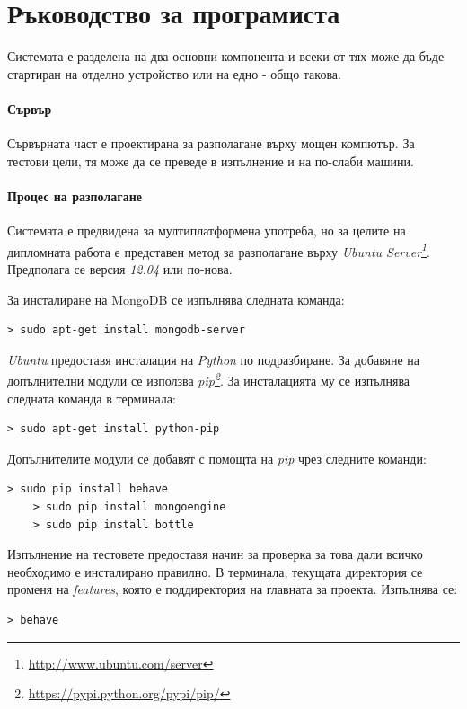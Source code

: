 \chapter{Ръководство за програмиста}
	
	Системата е разделена на два основни компонента и всеки от тях може да бъде стартиран на отделно устройство или на едно - общо такова.
	
	\subsubsection{Сървър}
	
	Сървърната част е проектирана за разполагане върху мощен компютър. За тестови цели, тя може да се преведе в изпълнение и на по-слаби машини.
	
	\subsubsection{Процес на разполагане}
	
	Системата е предвидена за мултиплатформена употреба, но за целите на дипломната работа е представен метод за разполагане върху \emph{Ubuntu Server\footnote{\url{http://www.ubuntu.com/server}}}. Предполага се версия \emph{12.04} или по-нова.
	
	За инсталиране на MongoDB се изпълнява следната команда:
	\begin{lstlisting}[style=BashStyle]
    > sudo apt-get install mongodb-server
	\end{lstlisting}
	
	\emph{Ubuntu} предоставя инсталация на \emph{Python} по подразбиране. За добавяне на допълнителни модули се използва \emph{pip\footnote{\url{https://pypi.python.org/pypi/pip/}}}. За инсталацията му се изпълнява следната команда в терминала:
	\begin{lstlisting}[style=BashStyle]
    > sudo apt-get install python-pip
	\end{lstlisting}

	Допълнителите модули се добавят с помощта на \emph{pip} чрез следните команди:
	\begin{lstlisting}[style=BashStyle]
    > sudo pip install behave
    > sudo pip install mongoengine
    > sudo pip install bottle
	\end{lstlisting}

	Изпълнение на тестовете предоставя начин за проверка за това дали всичко необходимо е инсталирано правилно. В терминала, текущата директория се променя на \emph{features}, която е поддиректория на главната за проекта. Изпълнява се:
	\begin{lstlisting}[style=BashStyle]
    > behave
	\end{lstlisting}		
	
